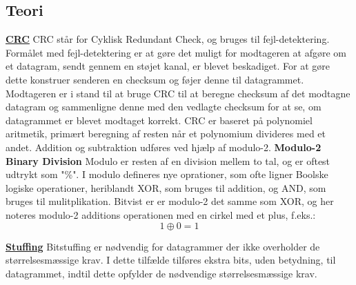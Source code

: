 \subsection{Teori}
\underline{\textbf{CRC}}
\newline
CRC står for Cyklisk Redundant Check, og bruges til fejl-detektering.
Formålet med fejl-detektering er at gøre det muligt for modtageren at afgøre om et datagram, sendt gennem en støjet kanal, er blevet beskadiget.
For at gøre dette konstruer senderen en checksum og føjer denne til datagrammet.
Modtageren er i stand til at bruge CRC til at beregne checksum af det modtagne datagram og sammenligne denne med den vedlagte checksum for at se, om datagrammet er blevet modtaget korrekt.\cite{ross}
\newline
CRC er baseret på polynomiel aritmetik, primært beregning af resten når et polynomium divideres med et andet. Addition og subtraktion udføres ved hjælp af modulo-2.  %
\newline
\textbf{Modulo-2 Binary Division}
\newline
Modulo er resten af en division mellem to tal, og er oftest udtrykt som "\%".
\newline
I modulo defineres nye oprationer, som ofte ligner Boolske logiske operationer, heriblandt XOR, som bruges til addition, og AND, som bruges til mulitplikation.
Bitvist er er modulo-2 det samme som XOR, og her noteres modulo-2 additions operationen med en cirkel med et plus, f.eks.: 
$$1 \oplus 0 = 1$$

\hfill \break
\underline{\textbf{Stuffing}}
\newline
Bitstuffing er nødvendig for datagrammer der ikke overholder de størrelsesmæssige krav. I dette tilfælde tilføres ekstra bits, uden betydning, til datagrammet, indtil dette opfylder de nødvendige størrelsesmæssige krav.
